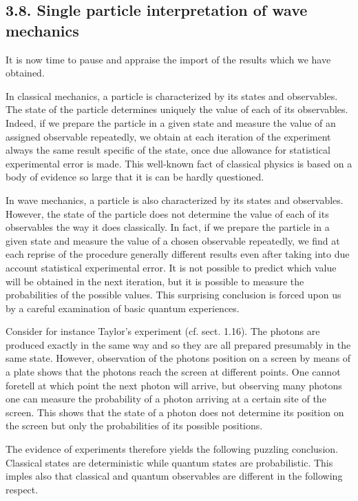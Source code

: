 \documentclass{article}
\begin{document}
\subsection*{3.8. Single particle interpretation of wave mechanics}

It is now time to pause and appraise the import of the results which we have obtained.

In classical mechanics, a particle is characterized by its states and observables. The state of the particle determines uniquely the value of each of its observables. Indeed, if we prepare the particle in a given state and measure the value of an assigned observable repeatedly, we obtain at each iteration of the experiment always the same result specific of the state, once due allowance for statistical experimental error is made. This well-known fact of classical physics is based on a body of evidence so large that it is can be hardly questioned.

In wave mechanics, a particle is also characterized by its states and observables. However, the state of the particle does not determine the value of each of its observables the way it does classically. In fact, if we prepare the particle in a given state and measure the value of a chosen observable repeatedly, we find at each reprise of the procedure generally different results even after taking into due account statistical experimental error. It is not possible to predict which value will be obtained in the next iteration, but it is possible to measure the probabilities of the possible values. This surprising conclusion is forced upon us by a careful examination of basic quantum experiences.

Consider for instance Taylor's experiment (cf. sect. 1.16). The photons are produced exactly in the same way and so they are all prepared presumably in the same state. However, observation of the photons position on a screen by means of a plate shows that the photons reach the screen at different points. One cannot foretell at which point the next photon will arrive, but observing many photons one can measure the probability of a photon arriving at a certain site of the screen. This shows that the state of a photon does not determine its position on the screen but only the probabilities of its possible positions.

The evidence of experiments therefore yields the following puzzling conclusion.
Classical states are deterministic while quantum states are probabilistic.
This imples also that classical and quantum observables are different in the following respect.
\end{document}
